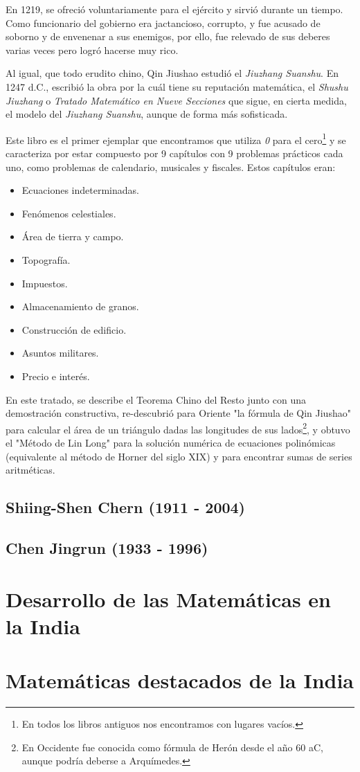 \documentclass[a4paper, 11pt]{article}
\begin{document}
		En 1219, se ofreció voluntariamente para el ejército y sirvió durante un tiempo. Como funcionario del gobierno
		era jactancioso, corrupto, y fue acusado de soborno y de envenenar a sus enemigos, por ello, fue relevado de sus
		deberes varias veces pero logró hacerse muy rico.
		
		Al igual, que todo erudito chino, Qin Jiushao estudió el \textit{Jiuzhang Suanshu}. En 1247 d.C., escribió la
		obra por la cuál tiene su reputación matemática, el \textit{Shushu Jiuzhang} o \textit{Tratado Matemático en Nueve
		Secciones} que sigue, en cierta medida, el modelo del \textit{Jiuzhang Suanshu}, aunque de forma más sofisticada.
		
		Este libro es el primer ejemplar que encontramos que utiliza \textit{0} para el cero\footnote{En todos los libros
		antiguos nos encontramos con lugares vacíos.} y se caracteriza por estar compuesto por 9 capítulos con 9 problemas
		prácticos cada uno, como problemas de calendario, musicales y fiscales. Estos capítulos eran:
		\begin{itemize}
			\item Ecuaciones indeterminadas.
			\item Fenómenos celestiales.
			\item Área de tierra y campo.
			\item Topografía.
			\item Impuestos.
			\item Almacenamiento de granos.
			\item Construcción de edificio.
			\item Asuntos militares.
			\item Precio e interés.
		\end{itemize}
		
		En este tratado, se describe el Teorema Chino del Resto junto con una demostración constructiva, re-descubrió
		para Oriente "la fórmula de Qin Jiushao" para calcular el área de un triángulo dadas las longitudes de sus
		lados\footnote{En Occidente fue conocida como fórmula de Herón desde el año 60 aC, aunque podría deberse a
		Arquímedes.}, y obtuvo el "Método de Lin Long" para la solución numérica de ecuaciones polinómicas (equivalente
		al método de Horner del siglo XIX) y para encontrar sumas de series aritméticas.
	
	\subsection{Shiing-Shen Chern (1911 - 2004)}
	
	\subsection{Chen Jingrun (1933 - 1996)}
				
\section{Desarrollo de las Matemáticas en la India}
\section{Matemáticas destacados de la India}

\newpage
{}

\end{document}
